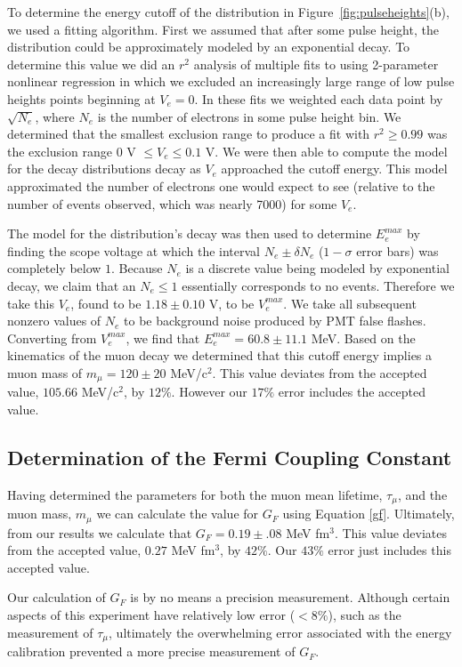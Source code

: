 To determine the energy cutoff of the distribution in Figure~\ref{fig:pulseheights}(b), we
used a fitting algorithm.  First we assumed that after some pulse
height, the distribution could be approximately modeled by an
exponential decay.  To determine this value we did an $r^{2}$ analysis
of multiple fits to using 2-parameter nonlinear regression in which we
excluded an increasingly large range of low pulse heights points
beginning at $V_{e}=0$.  In these fits we weighted each data point by
$\sqrt{N_{e}}$, where $N_{e}$ is the number of electrons in some pulse
height bin.  We determined that the smallest exclusion range to
produce a fit with $r^{2}\geq0.99$ was the exclusion range $0$ V $\leq
V_{e}\leq 0.1$ V.  We were then able to compute the model for the
decay distributions decay as $V_{e}$ approached the cutoff energy.
This model approximated the number of electrons one would expect to
see (relative to the number of events observed, which was nearly 7000)
for some $V_{e}$.

The model for the distribution's decay was then used to determine
$E_{e}^{max}$ by finding the scope voltage at which the interval
$N_{e}\pm \delta N_{e}$ ($1-\sigma$ error bars) was completely below
$1$.  Because $N_{e}$ is a discrete value being modeled by exponential
decay, we claim that an $N_{e} \leq 1$ essentially corresponds to no
events.  Therefore we take this $V_{e}$, found to be $1.18\pm0.10$ V,
to be $V_{e}^{max}$. We take all subsequent nonzero values of $N_{e}$
to be background noise produced by PMT false flashes.  Converting from
$V_{e}^{max}$, we find that $E_{e}^{max}=60.8 \pm 11.1$ MeV.  Based on
the kinematics of the muon decay we determined that this cutoff energy
implies a muon mass of $m_{\mu} = 120 \pm 20$ MeV/c$^{2}$.  This
value deviates from the accepted value, $105.66$ MeV/c$^{2}$, by $12\%$.
However our $17\%$ error includes the accepted value.

\subsection{Determination of the Fermi Coupling Constant}\label{determinationofweakforcecouplingconstant}

Having determined the parameters for both the muon mean lifetime, $\tau_{\mu}$, and the muon mass, $m_{\mu}$ we can calculate the value for $G_{F}$ using Equation \eqref{gf}. Ultimately, from our results we calculate that $G_{F}=0.19\pm.08$ MeV fm$^{3}$.  This value deviates from the accepted value, $0.27$ MeV fm$^{3}$\cite{pdg}, by $42\%$. Our $43\%$ error just includes this accepted value.

Our calculation of $G_F$ is by no means a precision measurement.  Although certain aspects of this experiment have relatively low error ($<8\%$), such as the measurement of $\tau_{\mu}$, ultimately the overwhelming error associated with the energy calibration prevented a more precise measurement of $G_F$.
